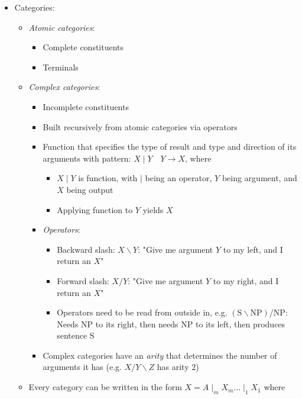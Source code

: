 \begin{itemize}
    \item Categories: 
    \begin{itemize}
        \item \emph{Atomic categories}: 
        \begin{itemize}
            \item Complete constituents
            \item Terminals
        \end{itemize}
        \item \emph{Complex categories}:
        \begin{itemize}
            \item Incomplete constituents
            \item Built recursively from atomic categories via operators
            \item Function that specifies the type of result and type and direction of its arguments
            with pattern: $X \mid Y \quad Y \to X$, where 
            \begin{itemize}
                \item $X \mid Y$ is function, with $\mid$ being an operator, $Y$ being argument, and $X$ being output
                \item Applying function to $Y$ yields $X$
            \end{itemize}
            \item \emph{Operators}:
            \begin{itemize}
                \item Backward slash: $X \backslash Y$: "Give me argument $Y$ to my left, and I return an $X$"
                \item Forward slash: $X / Y$: "Give me argument $Y$ to my right, and I return an $X$"
                \item Operators need to be read from outside in, e.g. $(\textrm{S} \backslash \textrm{NP}) / \textrm{NP}$: Needs $\textrm{NP}$ to its right, then needs $\textrm{NP}$ to its left, then produces sentence $\textrm{S}$
            \end{itemize}
            \item Complex categories have an \emph{arity} that determines the number of arguments it has (e.g. $X / Y \backslash Z$ has arity $2$)
        \end{itemize}
        \item Every category can be written in the form $X = A \mid_m X_m \dots \mid_1 X_1$ where

\end{itemize}
\end{itemize}
